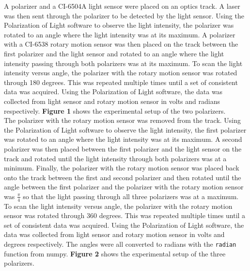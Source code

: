 \documentclass[
	letterpaper, %
	10pt, %
]{CSUniSchoolLabReport}
\begin{document}
A polarizer and a CI-6504A light sensor were placed on an optics track. A laser was then sent through the polarizer
to be detected by the light sensor. Using the Polarization of Light software to observe the light intensity, the
polarizer was rotated to an angle where the light intensity was at its maximum. A polarizer with a CI-6538 rotary
motion sensor was then placed on the track between the first polarizer and the light sensor and rotated to an angle
where the light intensity passing through both polarizers was at its maximum. To scan the light intensity versus
angle, the polarizer with the rotary motion sensor was rotated through 180 degrees. This was repeated multiple
times until a set of consistent data was acquired. Using the Polarization of Light software, the data was collected
from light sensor and rotary motion sensor in volts and radians respectively. \textbf{Figure 1} shows the experimental
setup of the two polarizers.\\

The polarizer with the rotary motion sensor was removed from the track. Using the Polarization of Light software to
observe the light intensity, the first polarizer was rotated to an angle where the light intensity was at its maximum.
A second polarizer was then placed between the first polarizer and the light sensor on the track and rotated until
the light intensity through both polarizers was at a minimum. Finally, the polarizer with the rotary motion sensor
was placed back onto the track between the first and second polarizer and then rotated until the angle between the
first polarizer and the polarizer with the rotary motion sensor was $\frac\pi4$ so that the light passing through
all three polarizers was at a maximum. To scan the light intensity versus angle, the polarizer with the rotary
motion sensor was rotated through 360 degrees. This was repeated multiple times until a set of consistent data
was acquired. Using the Polarization of Light software, the data was collected from light sensor and rotary
motion sensor in volts and degrees respectively. The angles were all converted to radians with the \lstinline{radian}
function from numpy. \textbf{Figure 2} shows the experimental setup of the three polarizers.
\end{document}
